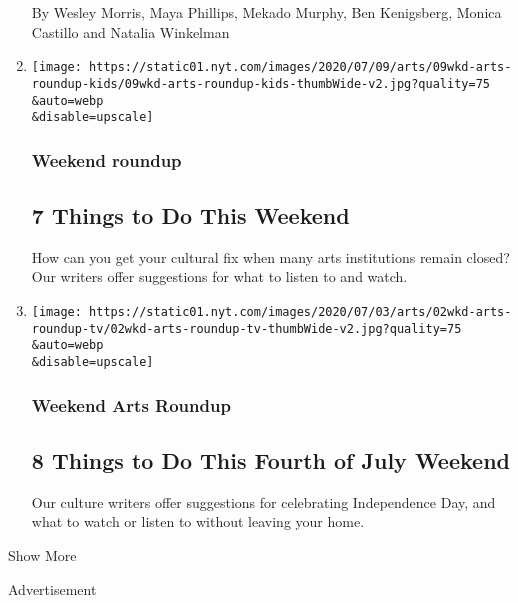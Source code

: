 \begin{enumerate}
  By Wesley Morris, Maya Phillips, Mekado Murphy, Ben Kenigsberg, Monica
  Castillo and Natalia Winkelman
\item
  \href{/2020/07/09/arts/things-to-do-weekend-coronavirus.html}{}

  \texttt{[image: https://static01.nyt.com/images/2020/07/09/arts/09wkd-arts-roundup-kids/09wkd-arts-roundup-kids-thumbWide-v2.jpg?quality=75\\\&auto=webp\\\&disable=upscale]}

  \hypertarget{weekend-roundup-1}{%
  \subsubsection{Weekend roundup}\label{weekend-roundup-1}}

  \hypertarget{7-things-to-do-this-weekend-1}{%
  \subsection{7 Things to Do This
  Weekend}\label{7-things-to-do-this-weekend-1}}

  How can you get your cultural fix when many arts institutions remain
  closed? Our writers offer suggestions for what to listen to and watch.
\item
  \href{/2020/07/02/arts/things-to-do-weekend-fourth-of-july-coronavirus.html}{}

  \texttt{[image: https://static01.nyt.com/images/2020/07/03/arts/02wkd-arts-roundup-tv/02wkd-arts-roundup-tv-thumbWide-v2.jpg?quality=75\\\&auto=webp\\\&disable=upscale]}

  \hypertarget{weekend-arts-roundup}{%
  \subsubsection{Weekend Arts Roundup}\label{weekend-arts-roundup}}

  \hypertarget{8-things-to-do-this-fourth-of-july-weekend}{%
  \subsection{8 Things to Do This Fourth of July
  Weekend}\label{8-things-to-do-this-fourth-of-july-weekend}}

  Our culture writers offer suggestions for celebrating Independence
  Day, and what to watch or listen to without leaving your home.
\end{enumerate}

Show More

Advertisement

